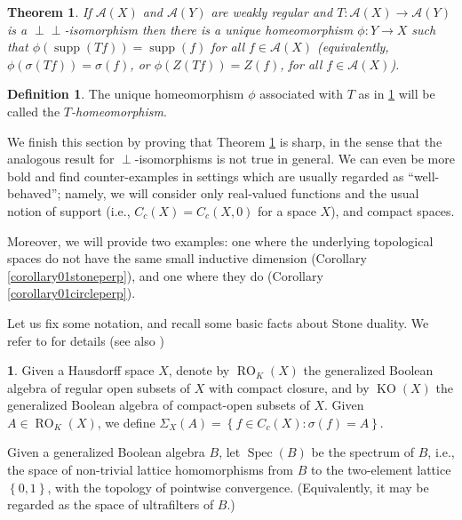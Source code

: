 \documentclass[letter,11pt]{amsart}
\theoremstyle{plain}		\newtheorem{theorem}[generalnumbering]{Theorem}
\theoremstyle{plain}		\newtheorem{corollary}[generalnumbering]{Corollary}
\theoremstyle{definition}		\newtheorem{definition}[generalnumbering]{Definition}
\theoremstyle{definition}		\newtheorem{example}[generalnumbering]{Example}
\theoremstyle{plain}		\newtheorem{proposition}[generalnumbering]{Proposition}
\theoremstyle{plain}		\newtheorem{lemma}[generalnumbering]{Lemma}
\newcommand{\namedenvironment}{}
\theoremstyle{definition}
\newtheorem*{theoremfornamed}{\namedenvironment}
\newenvironment{named}[1]{\renewcommand{\namedenvironment}{#1}\begin{theoremfornamed}}{\end{theoremfornamed}}
\newcommand{\perpp}{\perp\!\!\!\perp}
\DeclareMathOperator{\supp}{supp}
\begin{document}
\begin{theorem}\label{maintheorem}
	If $\mathcal{A}(X)$ and $\mathcal{A}(Y)$ are weakly regular and $T\colon\mathcal{A}(X)\to\mathcal{A}(Y)$ is a $\perpp$-isomorphism then there is a unique homeomorphism $\phi\colon Y\to X$ such that $\phi(\supp(Tf))=\supp(f)$ for all $f\in \mathcal{A}(X)$ (equivalently, $\phi(\sigma(Tf))=\sigma(f)$, or $\phi(Z(Tf))=Z(f)$, for all $f\in\mathcal{A}(X)$).
\end{theorem}

\begin{definition}\label{definitionthomeomorphism}
	The unique homeomorphism $\phi$ associated with $T$ as in \ref{maintheorem} will be called the \emph{$T$-homeomorphism}.
\end{definition}

We finish this section by proving that Theorem \ref{maintheorem} is sharp, in the sense that the analogous result for $\perp$-isomorphisms is not true in general. We can even be more bold and find counter-examples in settings which are usually regarded as ``well-behaved''; namely, we will consider only real-valued functions and the usual notion of support (i.e., $C_c(X)=C_c(X,0)$ for a space $X$), and compact spaces.

Moreover, we will provide two examples: one where the underlying topological spaces do not have the same small inductive dimension (Corollary \ref{corollary01stoneperp}), and one where they do (Corollary \ref{corollary01circleperp}).

Let us fix some notation, and recall some basic facts about Stone duality. We refer to \cite{MR1507106,dml124080} for details (see also \cite[II.4.4]{MR861951})

\begin{named}{Notation}
	Given a Hausdorff space $X$, denote by $\operatorname{RO}_K(X)$ the generalized Boolean algebra of regular open subsets of $X$ with compact closure, and by $\operatorname{KO}(X)$ the generalized Boolean algebra of compact-open subsets of $X$. Given $A\in \operatorname{RO}_K(X)$, we define $\Sigma_X(A)=\left\{f\in C_c(X):\sigma(f)=A\right\}$.
	
	Given a generalized Boolean algebra $B$, let $\operatorname{Spec}(B)$ be the spectrum of $B$, i.e., the space of non-trivial lattice homomorphisms from $B$ to the two-element lattice $\left\{0,1\right\}$, with the topology of pointwise convergence. (Equivalently, it may be regarded as the space of ultrafilters of $B$.)
\end{named}
\end{document}
